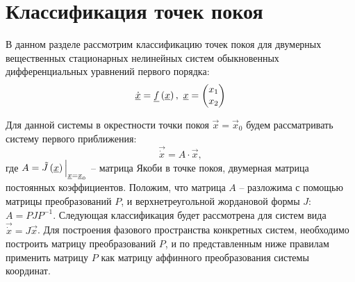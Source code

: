 \section{Классификация точек покоя}

	В данном разделе рассмотрим классификацию точек покоя для двумерных вещественных стационарных нелинейных систем обыкновенных дифференциальных уравнений первого порядка:
	\[ \underline{\dot{x}} = \underline{f}\left( \underline{x} \right), ~ \underline{x} = \begin{pmatrix} x_1 \\ x_2 \end{pmatrix} \]

	Для данной системы в окрестности точки покоя $\vec{x} = \vec{x}_0$ будем рассматривать систему первого приближения:
	\[ \vec{\dot{x}} = A \cdot \vec{x}, \]
	где $A = \tilde{J}\left( \underline{x} \right) \Bigl\vert \Bigr._{\underline{x} = \underline{x}_0}$ -- матрица Якоби в точке покоя, двумерная матрица постоянных коэффициентов. Положим, что матрица $A$ -- разложима с помощью матрицы преобразований $P$, и верхнетреугольной жордановой формы $J$: $A = PJP^{-1}$. Следующая классификация будет рассмотрена для систем вида $\vec{\dot{x}} = J \vec{x}$. Для построения фазового пространства конкретных систем, необходимо построить матрицу преобразований $P$, и по представленным ниже правилам применить матрицу $P$ как матрицу аффинного преобразования системы координат.

